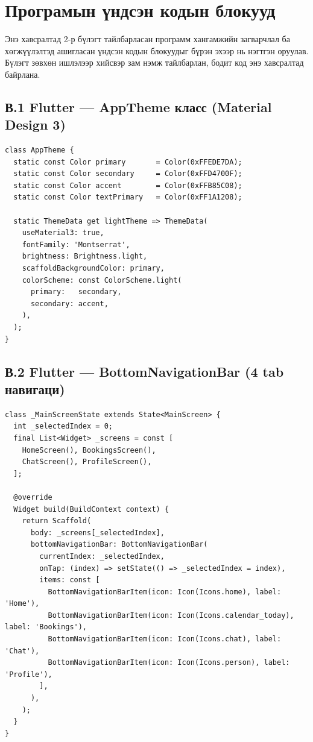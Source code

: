 \chapter{Програмын үндсэн кодын блокууд}
\label{AppendixC}
\pagecolor{white}

Энэ хавсралтад 2-р бүлэгт тайлбарласан программ хангамжийн загварчлал ба хөгжүүлэлтэд ашигласан үндсэн кодын блокуудыг бүрэн эхээр нь нэгтгэн оруулав. Бүлэгт зөвхөн ишлэлээр хийсвэр зам нэмж тайлбарлан, бодит код энэ хавсралтад байрлана.


\section*{В.1 Flutter --- AppTheme класс (Material Design 3)}

\begin{lstlisting}[language={}, caption={lib/theme/app\_theme.dart --- Дулаан говийн өнгөн схем}, label={lst:apptheme}]
class AppTheme {
  static const Color primary       = Color(0xFFEDE7DA);
  static const Color secondary     = Color(0xFFD4700F);
  static const Color accent        = Color(0xFFB85C08);
  static const Color textPrimary   = Color(0xFF1A1208);

  static ThemeData get lightTheme => ThemeData(
    useMaterial3: true,
    fontFamily: 'Montserrat',
    brightness: Brightness.light,
    scaffoldBackgroundColor: primary,
    colorScheme: const ColorScheme.light(
      primary:   secondary,
      secondary: accent,
    ),
  );
}
\end{lstlisting}


\section*{В.2 Flutter --- BottomNavigationBar (4 tab навигаци)}

\begin{lstlisting}[language={}, caption={lib/screens/main\_screen.dart --- үндсэн навигаци}, label={lst:bottomnav}]
class _MainScreenState extends State<MainScreen> {
  int _selectedIndex = 0;
  final List<Widget> _screens = const [
    HomeScreen(), BookingsScreen(),
    ChatScreen(), ProfileScreen(),
  ];

  @override
  Widget build(BuildContext context) {
    return Scaffold(
      body: _screens[_selectedIndex],
      bottomNavigationBar: BottomNavigationBar(
        currentIndex: _selectedIndex,
        onTap: (index) => setState(() => _selectedIndex = index),
        items: const [
          BottomNavigationBarItem(icon: Icon(Icons.home), label: 'Home'),
          BottomNavigationBarItem(icon: Icon(Icons.calendar_today), label: 'Bookings'),
          BottomNavigationBarItem(icon: Icon(Icons.chat), label: 'Chat'),
          BottomNavigationBarItem(icon: Icon(Icons.person), label: 'Profile'),
        ],
      ),
    );
  }
}
\end{lstlisting}

